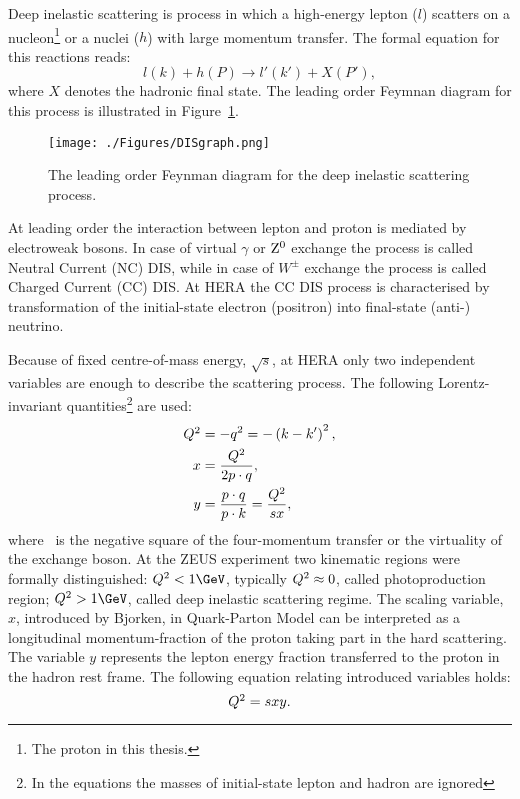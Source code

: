 Deep inelastic scattering is process in which a high-energy lepton ($l$) scatters on a nucleon\footnote{The proton in this thesis.} or a nuclei ($h$) with large momentum transfer. The formal equation for this reactions reads:
\begin{equation}
l\left( k \right) + h\left( P \right) \rightarrow l'\left( k' \right) + X\left( P' \right),
\label{eq:DISreactions}
\end{equation}
where $X$ denotes the hadronic final state. The leading order Feymnan diagram for this process is illustrated in Figure~\ref{fig:DISgraph}.
\begin{figure}
	\centering
		\texttt{[image: ./Figures/DISgraph.png]}
	\caption{The leading order Feynman diagram for the deep inelastic scattering process.}
	\label{fig:DISgraph}
\end{figure}
At leading order the interaction between lepton and proton is mediated by electroweak bosons. In case of virtual $\gamma$ or $\mbox{$\rm{Z}^0$}$ exchange the process is called Neutral Current (NC) DIS, while in case of $W^\pm$ exchange the process is called Charged Current (CC) DIS. At HERA the CC DIS process is characterised by transformation of the initial-state electron (positron) into final-state (anti-) neutrino.

Because of fixed centre-of-mass energy, $\sqrt{s}$, at HERA only two independent variables are enough to describe the scattering process. The following Lorentz-invariant quantities\footnote{In the equations the masses of initial-state lepton and hadron are ignored} are used:
\begin{align}
\mbox{${Q^2}$} &= -q^2 = -\left( k - k' \right)^2,\\
     x &= \frac{\mbox{${Q^2}$}}{2p\cdot q},\\
		 y &= \frac{p\cdot q}{p\cdot k} = \frac{\mbox{${Q^2}$}}{sx},
\label{eq:vardefinit}
\end{align}
where \qsq\, is the negative square of the four-momentum transfer or the virtuality of the exchange boson. At the ZEUS experiment two kinematic regions were formally distinguished: $\qsq < 1\GeV$, typically $\mbox{${Q^2}$} \approx 0$, called photoproduction region; $\qsq > 1\GeV$, called deep inelastic scattering regime. The scaling variable, $x$, introduced by Bjorken, in Quark-Parton Model can be interpreted as a longitudinal momentum-fraction of the proton taking part in the hard scattering. The variable $y$ represents the lepton energy fraction transferred to the proton in the hadron rest frame. The following equation relating introduced variables holds:
\begin{equation}
\mbox{${Q^2}$} = sxy.
\label{eq:qsxy}
\end{equation}

